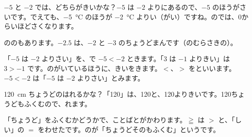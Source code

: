 $-5$ と $-2$ では、どちらがきいかな？\quad $-5$ は $-2$ よりにあるので、$-5$ のほうがさいです。でえても、\qty{-5}{\degreeCelsius} のほうが \qty{-2}{\degreeCelsius} よりい（がい）ですね。のでは、0からいほどさくなります。

ののもあります。$-2.5$ は、$-2$ と $-3$ のちょうどまんです（のむらさきの）。


\leavevmode\label{bk:2-2:futougou}「$-5$ は $-2$ よりさい」を、で $-5<-2$ ときます。「$3$ は $-1$ よりきい」は $3>-1$ です。のがいているほうに、きいをきます。$<$、$>$ を\textbf{}といいます。$-5<-2$ は「$-5$ は $-2$ よりさい」とみます。

\noindent\begin{minipage}[c]{0.40\linewidth}\centering
{}
\end{minipage}\hfill
\begin{minipage}[c]{0.57\linewidth}
\qty{120}{cm} ちょうどのはれるかな？\quad「120」は、120と、120よりきいです。120ちょうどもふくむので、れます。
\end{minipage}

\par\vspace{2mm}
「ちょうど」をふくむかどうかで、ことばとがかわります。$\geqq$ は $>$ と、「しい」の $=$ をわせたです。のが「ちょうどそのもふくむ」というです。

